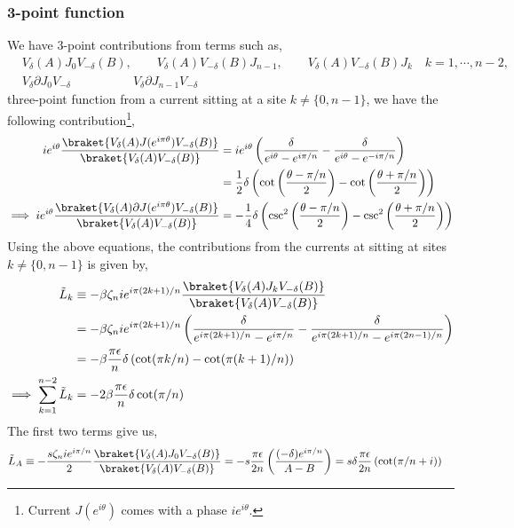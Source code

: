 \documentclass[11pt]{article}
\newcommand{\ep}{\epsilon}
\newcommand{\p}{\partial}
\newcommand{\lb}{\left(}
\newcommand{\rb}{\right)}
\begin{document}
\subsubsection{3-point function}
We have 3-point contributions from terms such as,
\begin{align}
    &V_\delta(A) J_0 V_{-\delta}(B) , \qquad V_\delta(A)  V_{-\delta}(B) J_{n-1}, \qquad V_\delta(A)  V_{-\delta}(B) J_k \quad k = 1,\cdots,n-2, \\
   &  V_\delta \p J_0 V_{-\delta} \qquad \qquad \quad  V_\delta \p J_{n-1}V_{-\delta} 
\end{align}
three-point function from a current sitting at a site $k \neq \{0,n-1\}$, we have the following contribution\footnote{Current $J(e^{i\theta})$ comes with a phase $ie^{i\theta}$.},
\begin{align}
    i e^{i\theta} \frac{\braket{V_\delta(A)J(e^{i\pi\theta})V_{-\delta}(B)}}{\braket{V_{\delta}(A)V_{-\delta}(B)}} &=i  e^{i\theta} \lb\frac{\delta}{e^{i\theta} - e^{i\pi/n} }- \frac{\delta}{e^{i\theta} - e^{-i\pi/n} } \rb \\
    &= \frac{1}{2}\delta \lb \cot\lb\frac{\theta - \pi/n}{2} \rb -\cot\lb\frac{\theta +\pi/n}{2} \rb \rb \\
    \implies i e^{i\theta} \frac{\braket{V_\delta(A)\p J(e^{i\pi\theta})V_{-\delta}(B)}}{\braket{V_{\delta}(A)V_{-\delta}(B)}} &= -\frac{1}{4}\delta \lb \csc^2 \lb \frac{\theta - \pi/n}{2}\rb  - \csc^2\lb\frac{\theta + \pi/n}{2}\rb\rb
\end{align}
Using the above equations, the  contributions from the currents at sitting at sites $k \neq \{0,n-1\}$ is given by,
\begin{align}
    \tilde{L}_k &\equiv -\beta \zeta_n i e^{i\pi (2k+1)/n} \frac{\braket{V_\delta(A)J_kV_{-\delta}(B)}}{\braket{V_{\delta}(A)V_{-\delta}(B)}}\\
    &=-\beta \zeta_n i e^{i\pi (2k+1)/n} \lb \frac{\delta }{e^{i\pi(2k+1)/n } - e^{i\pi/n} } - \frac{\delta }{e^{i\pi(2k+1)/n } - e^{i\pi(2n-1)/n} } \rb \\
    &= -\beta \frac{\pi \ep}{n}\delta \lb \cot(\pi k/n) - \cot(\pi (k+1)/n) \rb
    \\
    \implies \sum_{k=1}^{n-2}\tilde{L}_k &= -2\beta \frac{\pi \ep}{n} \delta \cot(\pi/n)
\end{align}
The first two terms give us,
\begin{align}
    \tilde{L}_A &\equiv -\frac{s\zeta_ni e^{i\pi/n}}{2}\frac{\braket{V_\delta(A)J_0V_{-\delta}(B)}}{\braket{V_{\delta}(A)V_{-\delta}(B)}} =-s\frac{\pi \ep}{2n} \lb \frac{(-\delta) e^{i\pi /n}}{A-B} \rb = s\delta \frac{\pi \ep}{2n}\lb\cot(\pi/n + i)\rb 
\end{align}
\end{document}
